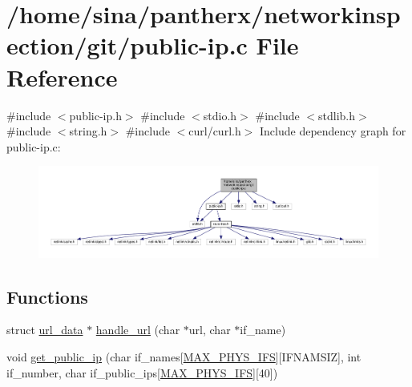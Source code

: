 \hypertarget{public-ip_8c}{}\section{/home/sina/pantherx/networkinspection/git/public-\/ip.c File Reference}
\label{public-ip_8c}
{\ttfamily \#include $<$public-\/ip.\+h$>$}\newline
{\ttfamily \#include $<$stdio.\+h$>$}\newline
{\ttfamily \#include $<$stdlib.\+h$>$}\newline
{\ttfamily \#include $<$string.\+h$>$}\newline
{\ttfamily \#include $<$curl/curl.\+h$>$}\newline
Include dependency graph for public-\/ip.c\+:\nopagebreak
\begin{figure}[H]
\begin{center}
\leavevmode
\includegraphics[width=350pt]{public-ip_8c__incl}
\end{center}
\end{figure}
\subsection*{Functions}
\begin{DoxyCompactItemize}
\item 
struct \hyperlink{structurl__data}{url\+\_\+data} $\ast$ \hyperlink{public-ip_8c_a546e9ee82a2fff0c37e173d76ab08db4}{handle\+\_\+url} (char $\ast$url, char $\ast$if\+\_\+name)
\item 
void \hyperlink{public-ip_8c_a035017d88204b5d04e2971a7700482e6}{get\+\_\+public\+\_\+ip} (char if\+\_\+names\mbox{[}\hyperlink{route-tree_8h_a5f66955385e84e67789d731b5cad24c7}{M\+A\+X\+\_\+\+P\+H\+Y\+S\+\_\+\+I\+FS}\mbox{]}\mbox{[}I\+F\+N\+A\+M\+S\+IZ\mbox{]}, int if\+\_\+number, char if\+\_\+public\+\_\+ips\mbox{[}\hyperlink{route-tree_8h_a5f66955385e84e67789d731b5cad24c7}{M\+A\+X\+\_\+\+P\+H\+Y\+S\+\_\+\+I\+FS}\mbox{]}\mbox{[}40\mbox{]})
\end{DoxyCompactItemize}


